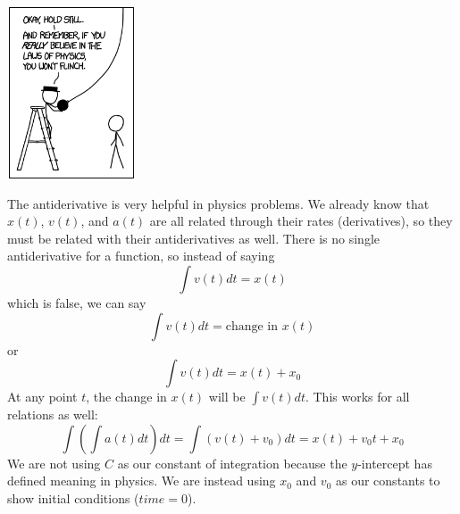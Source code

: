 \documentclass[../revisedmain.tex]{subfiles}
\begin{document}
	\vspace{.125in}
	\begin{center}
		\includegraphics[width=1.5in,height=2in]{images/physics.png}
	\end{center}
	\vspace{.25in}
The antiderivative is very helpful in physics problems. We already know that $x(t)$, $v(t)$, and $a(t)$ are all related through their rates (derivatives), so they must be related with their antiderivatives as well. There is no single antiderivative for a function, so instead of saying $$\int v(t) dt=x(t)$$ which is false, we can say$$\int v(t)dt=\text{change in }x(t)$$or$$\int v(t)dt=x(t)+x_0$$At any point $t$, the change in $x(t)$ will be $\int v(t) dt$. This works for all relations as well:$$\int\left(\int a(t) dt\right)dt=\int (v(t)+v_0)dt=x(t)+v_0t+x_0$$We are not using $C$ as our constant of integration because the $y$-intercept has defined meaning in physics. We are instead using $x_0$ and $v_0$ as our constants to show initial conditions ($time=0$).\\
\end{document}
